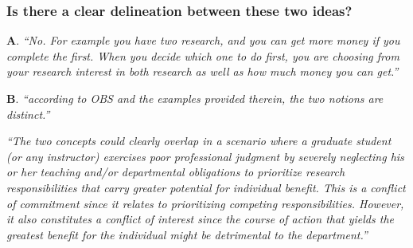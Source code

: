 \documentclass[12pt]{beamer}
\newcommand\ans[1]{{\it ``#1''}}
\newcommand\gap{\vspace{5mm}}
\begin{document}
\begin{frame} %
\frametitle{ 
  Is there a clear delineation between these two ideas?
}

{\bf A}. \ans{No.  For example you have two research, and you can get more money if you complete the first.  When you decide which one to do first, you are choosing from your research interest in both research as well as how much money you can get.}

\gap

{\bf B}. \ans{according to OBS and the examples provided therein, the two notions are distinct.}

\end{frame}
\begin{frame}
  
\ans{The  two  concepts  could  clearly  overlap  in  a  scenario  where  a  graduate  student  (or any instructor) exercises poor professional judgment by severely neglecting his or her teaching  and/or  departmental  obligations  to  prioritize  research  responsibilities  that carry greater potential for individual benefit.  This is a conflict of commitment since it relates to prioritizing competing responsibilities.  However, it also constitutes a conflict of interest since the course of action that yields the greatest benefit for the individual might be detrimental to the department.}









\end{frame}
\end{document}
